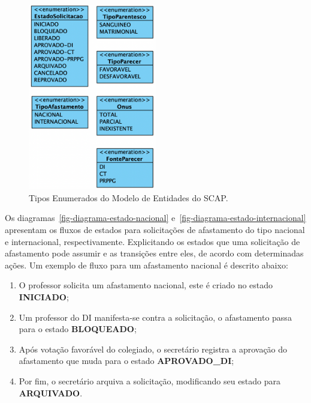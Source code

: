 \begin{figure}
    \centering
    \includegraphics[width=0.5\textwidth]{figuras/fig-modelo-entidades-enum.png}
    \caption{Tipos Enumerados do Modelo de Entidades do SCAP.}
    \label{fig-modelo-entidades-enum}
\end{figure}


Os diagramas~\ref{fig-diagrama-estado-nacional} e~\ref{fig-diagrama-estado-internacional} apresentam os fluxos de estados
para solicitações de afastamento do tipo nacional e internacional, respectivamente.
Explicitando os estados que uma solicitação de afastamento pode assumir e as transições entre eles,
de acordo com determinadas ações. Um exemplo de fluxo para um afastamento nacional é descrito abaixo:

\begin{enumerate}
    \item O professor solicita um afastamento nacional, este é criado no estado \textbf{INICIADO};
    \item Um professor do DI manifesta-se contra a solicitação, o afastamento passa para o estado \textbf{BLOQUEADO};
    \item Após votação favorável do colegiado, o secretário registra a aprovação do afastamento que muda para o estado \textbf{APROVADO\_DI};
    \item Por fim, o secretário arquiva a solicitação, modificando seu estado para \textbf{ARQUIVADO}.
\end{enumerate}

